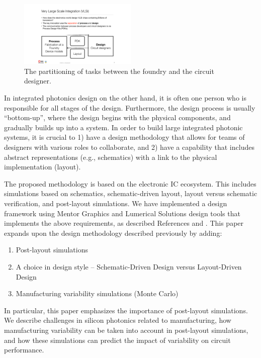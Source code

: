 \documentclass[journal]{spie}
\begin{document}
\begin{figure}[tbp]
	\centering
	\includegraphics[width=0.5\textwidth]{../figs_paper/Process_Design.pdf}
    \caption[]{The partitioning of tasks between the foundry and the circuit designer.}
    \label{Process_Design}
\end{figure}



In integrated photonics design on the other hand, it is often one person who is responsible for all stages of the design.  Furthermore, the design process is usually ``bottom-up'', where the design begins with the physical components, and gradually builds up into a system.   In order to build large integrated photonic systems, it is crucial to 1) have a design methodology that allows for teams of designers with various roles to collaborate, and 2) have a capability that includes abstract representations (e.g., schematics) with a link to the physical implementation (layout).  

The proposed methodology is based on the electronic IC ecosystem.  This includes simulations based on schematics, schematic-driven layout, layout versus schematic verification, and post-layout simulations.   We have implemented a design framework using Mentor Graphics and Lumerical Solutions design tools that implements the above requirements, as described References  and .
This paper expands upon the design methodology described previously by adding:
\begin{enumerate} 
\item Post-layout simulations
\item A choice in design style -- Schematic-Driven Design versus Layout-Driven Design
\item Manufacturing variability simulations (Monte Carlo)
\end{enumerate}
In particular, this paper emphasizes the importance of post-layout simulations.  We describe challenges in silicon photonics related to manufacturing, how manufacturing variability can be taken into account in post-layout simulations, and how these simulations can predict the impact of variability on circuit performance.
\end{document}
